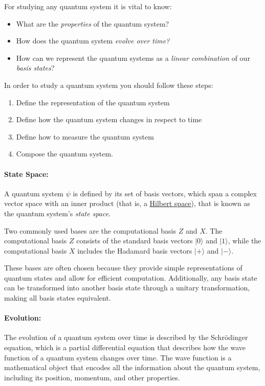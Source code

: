 \documentclass[11pt]{article}
\providecommand{\ket}[1]{|#1\rangle}
\theoremstyle{definition}
\theoremstyle{definition}
\begin{document}
For studying any quantum system it is vital to know:
\begin{itemize}
\item What are the \emph{properties} of the quantum system?
\item How does the quantum system \emph{evolve over time?}
\item How can we represent the quantum systems as a \emph{linear combination} of our \emph{basis states}?
\end{itemize}

In order to study a quantum system you should follow these steps:
\begin{enumerate}
\item Define the representation of the quantum system
\item Define how the quantum system changes in respect to time
\item Define how to measure the quantum system
\item Compose the quantum system.
\end{enumerate}



\paragraph{State Space:}
\label{sec:orgd681e2b}
A quantum system \(\psi\) is defined by its set of basis vectors, which span
a complex vector space with an inner product (that is, a \hyperref[sec:org36afc5a]{Hilbert space}), 
that is known as the quantum system's \emph{state space}. 

Two commonly used bases are the computational basis \(Z\) and \(X\). 
The computational basis \(Z\) consists of the standard basis vectors
\(\ket{0}\) and \(\ket{1}\), while the computational basis \(X\) includes the
Hadamard basis vectors \(\ket{+}\) and \(\ket{-}\).

These bases are often chosen because they provide simple representations
of quantum states and allow for efficient computation. Additionally, any
basis state can be transformed into another basis state through a unitary
transformation, making all basis states equivalent.

\paragraph{Evolution:}
\label{sec:orgd6b4f10}
The evolution of a quantum system over time is described by the Schrödinger
equation, which is a partial differential equation that describes how the
wave function of a quantum system changes over time. The wave function is
a mathematical object that encodes all the information about the quantum
system, including its position, momentum, and other properties.
\end{document}
